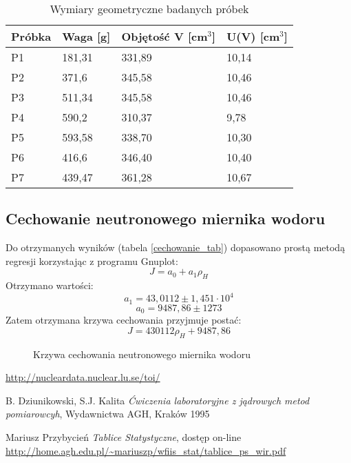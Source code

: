 \documentclass{article}
\begin{document}
\begin{table}[h!]
\centering
\label{wynikiP}
\caption{Wymiary geometryczne badanych próbek}
\begin{tabular}{|C{2cm}|C{2cm}|C{2cm}|C{2cm}|}\hline
	Próbka & Waga [g] & Objętość V [cm$^3$] & U(V) [cm$^3$] \\ \hline
		P1	&	181,31	&	331,89	&	10,14 \\ \hline
		P2	&	371,6	&	345,58	&	10,46  \\ \hline
		P3	&	511,34	&	345,58	&	10,46 \\ \hline
		P4	&	590,2	&	310,37	&	9,78 \\ \hline
		P5	&	593,58	&	338,70	&	10,30 \\ \hline
		P6	&	416,6	&	346,40	&	10,40 \\ \hline
		P7	&	439,47	&	361,28	&	10,67 \\ \hline

\end{tabular}

\end{table}
\newpage
\subsection{Cechowanie neutronowego miernika wodoru}
Do otrzymanych wyników (tabela \ref{cechowanie_tab}) dopasowano prostą metodą regresji korzystając z programu Gnuplot:
\begin{equation}
	J = a_0 + a_1\rho_H
\end{equation}
 Otrzymano wartości:
 \begin{equation*}
 	a_1 = 43,0112 \pm 1,451\cdot 10^4
 \end{equation*}
 \begin{equation*}
 	a_0 = 9487,86 \pm 1273
 \end{equation*}
Zatem otrzymana krzywa cechowania przyjmuje postać:
\begin{equation*}
	J = 430112\rho_H + 9487,86
\end{equation*}



\begin{figure}[h!]
	\fontsize{6}{8}\selectfont %
	\centering
	\resizebox{1.0\textwidth}{!}{}	
	\caption{Krzywa cechowania neutronowego miernika wodoru}
	\label{krzywa}
\end{figure}


\newpage
\begin{thebibliography}{9}
	
	
	\url{http://nucleardata.nuclear.lu.se/toi/}

	
	B. Dziunikowski, S.J. Kalita
	\emph{Ćwiczenia laboratoryjne z jądrowych metod pomiarowcyh}, Wydawnictwa AGH, Kraków 1995
	
	Mariusz Przybycień \emph{Tablice Statystyczne}, dostęp on-line\\
	\url{http://home.agh.edu.pl/~mariuszp/wfiis_stat/tablice_ps_wir.pdf}
\end{thebibliography}
\vspace{2cm}
\end{document}
